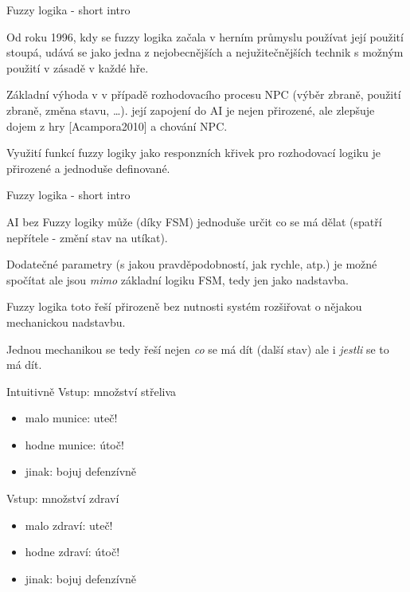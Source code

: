 ﻿\documentclass[a4paper]{beamer}
\begin{document}
\begin{frame}{Fuzzy logika - short intro}

Od roku 1996, kdy se fuzzy logika začala v herním průmyslu používat její použití stoupá, udává se jako jedna z nejobecnějších a nejužitečnějších technik s možným použití v zásadě v každé hře.%

\vfill
Základní výhoda v v případě rozhodovacího procesu NPC (výběr zbraně, použití zbraně, změna stavu, \ldots). její zapojení do AI je nejen přirozené, ale zlepšuje dojem z hry [Acampora2010] a chování NPC. 

\vfill
Využití funkcí fuzzy logiky jako responzních křivek pro rozhodovací logiku je přirozené a jednoduše definované.

\end{frame}

\begin{frame}{Fuzzy logika - short intro}

AI bez Fuzzy logiky může (díky FSM) jednoduše určit co se má dělat (spatří nepřítele - změní stav na utíkat).

\vfill
Dodatečné parametry (s jakou pravděpodobností, jak rychle, atp.) je možné spočítat ale jsou \emph{mimo} základní logiku FSM, tedy jen jako nadstavba. 

\vfill
Fuzzy logika toto řeší přirozeně bez nutnosti systém rozšiřovat o nějakou mechanickou nadstavbu. 

\vfill
Jednou mechanikou se tedy řeší nejen \emph{co} se má dít (další stav) ale i \emph{jestli} se to má dít. 

\end{frame}


\begin{frame}{Intuitivně}
Vstup: množství střeliva
\begin{itemize}
\item malo munice: uteč!
\item hodne munice: útoč!
\item jinak: bojuj defenzívně
\end{itemize}

Vstup: množství zdraví
\begin{itemize}
\item malo zdraví: uteč!
\item hodne zdraví: útoč!
\item jinak: bojuj defenzívně
\end{itemize}
\end{frame}
\end{document}

